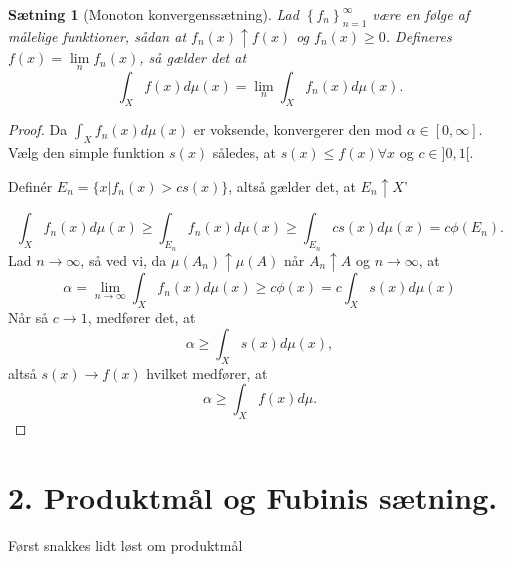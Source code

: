 \documentclass[12pt]{report}
\newtheorem{theorem}[lemma]{Sætning}
\theoremstyle{break}
\newtheorem*{proof}{Bevis}
\theoremstyle{break}
\newcommand{\1}{\mathds{1}}
\begin{document}
\begin{theorem}[Monoton konvergenssætning]
	Lad $\left\{ f_n \right\}_{n=1}^\infty$ være en følge af målelige funktioner, sådan at $f_n(x)\uparrow f(x)$ og $f_n(x)\geq 0$. Defineres $f(x)= \lim\limits_{n}f_n(x)$, så gælder det at
	\[ \int_X f(x)d\mu (x)=\lim\limits_{n}\int_X f_n(x)d\mu (x).\]
\end{theorem}
\begin{proof}
	Da $\int_X f_n(x)d\mu(x)$ er voksende, konvergerer den mod $\alpha \in [0,\infty]$. Vælg den simple funktion $s(x)$ således, at $s(x)\leq f(x) \forall x$ og $c\in ]0,1[$.
	
	\bigskip
	
	Definér $E_n=\{x|f_n(x)>cs(x)\}$, altså gælder det, at $E_n\uparrow X$'
	
	\bigskip
	
	\[\int_X f_n(x)d\mu(x)\geq \int_{E_n}f_n(x)d\mu(x) \geq \int_{E_n}cs(x)d\mu(x)=c\phi(E_n).\]
	Lad $n\to \infty$, så ved vi, da $\mu (A_n)\uparrow\mu(A)$ når $A_n\uparrow A$ og $n\to \infty$, at 
	\[ \alpha=\lim\limits_{n\to\infty}\int_X f_n(x)d\mu(x)\geq c\phi(x)=c\int_Xs(x) d\mu(x) \]
	Når så $c\to 1$, medfører det, at
	\[ \alpha \geq \int_X s(x) d\mu(x), \]
	altså $s(x)\to f(x)$ hvilket medfører, at
	\[ \alpha \geq \int_X f(x) d\mu. \]
\end{proof}
\newpage

\section*{2. Produktmål og Fubinis sætning.}
Først snakkes lidt løst om produktmål

\bigskip
\end{document}
